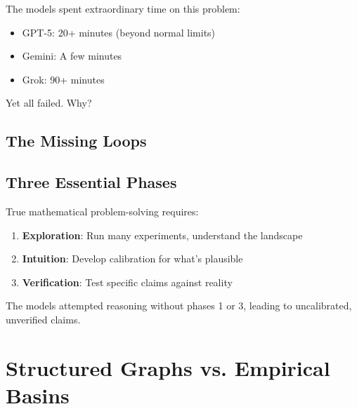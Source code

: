 \documentclass[11pt]{article}
\begin{document}
The models spent extraordinary time on this problem:
\begin{itemize}
\item GPT-5: 20+ minutes (beyond normal limits)
\item Gemini: A few minutes
\item Grok: 90+ minutes
\end{itemize}

Yet all failed. Why?

\subsection{The Missing Loops}

\begin{center}
\end{center}

\subsection{Three Essential Phases}

True mathematical problem-solving requires:

\begin{enumerate}
\item \textbf{Exploration}: Run many experiments, understand the landscape
\item \textbf{Intuition}: Develop calibration for what's plausible
\item \textbf{Verification}: Test specific claims against reality
\end{enumerate}

The models attempted reasoning without phases 1 or 3, leading to uncalibrated, unverified claims.

\section{Structured Graphs vs. Empirical Basins}
\end{document}
